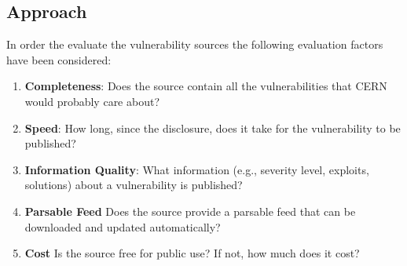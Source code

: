 \subsection{Approach}
In order the evaluate the vulnerability sources the following evaluation factors have been considered:
\begin{enumerate}
\item \textbf{Completeness}: Does the source contain all the vulnerabilities that CERN would probably care about? 
\item \textbf{Speed}: How long, since the disclosure, does it take for the vulnerability to be published?
\item \textbf{Information Quality}: What information (e.g., severity level, exploits, solutions) about a vulnerability is published?
\item \textbf{Parsable Feed} Does the source provide a parsable feed that can be downloaded and updated automatically?
\item \textbf{Cost} Is the source free for public use? If not, how much does it cost?
\end{enumerate} 

